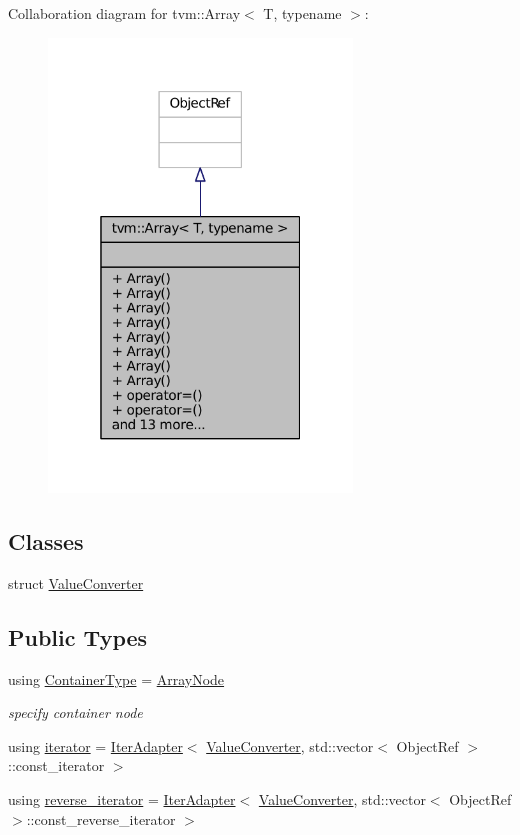 Collaboration diagram for tvm\+:\+:Array$<$ T, typename $>$\+:
\nopagebreak
\begin{figure}[H]
\begin{center}
\leavevmode
\includegraphics[width=229pt]{classtvm_1_1Array__coll__graph}
\end{center}
\end{figure}
\subsection*{Classes}
\begin{DoxyCompactItemize}
\item 
struct \hyperlink{structtvm_1_1Array_1_1ValueConverter}{Value\+Converter}
\end{DoxyCompactItemize}
\subsection*{Public Types}
\begin{DoxyCompactItemize}
\item 
using \hyperlink{classtvm_1_1Array_ab85f7f463f8a418f6b4dcffdf43b007c}{Container\+Type} = \hyperlink{classtvm_1_1ArrayNode}{Array\+Node}
\begin{DoxyCompactList}\small\item\em specify container node \end{DoxyCompactList}\item 
using \hyperlink{classtvm_1_1Array_a82550eb5257293ba5af8866aa8ff16e6}{iterator} = \hyperlink{classtvm_1_1IterAdapter}{Iter\+Adapter}$<$ \hyperlink{structtvm_1_1Array_1_1ValueConverter}{Value\+Converter}, std\+::vector$<$ Object\+Ref $>$\+::const\+\_\+iterator $>$
\item 
using \hyperlink{classtvm_1_1Array_a6b71ab5c7c8c2abffe81a0ea3842fd1a}{reverse\+\_\+iterator} = \hyperlink{classtvm_1_1IterAdapter}{Iter\+Adapter}$<$ \hyperlink{structtvm_1_1Array_1_1ValueConverter}{Value\+Converter}, std\+::vector$<$ Object\+Ref $>$\+::const\+\_\+reverse\+\_\+iterator $>$
\end{DoxyCompactItemize}
